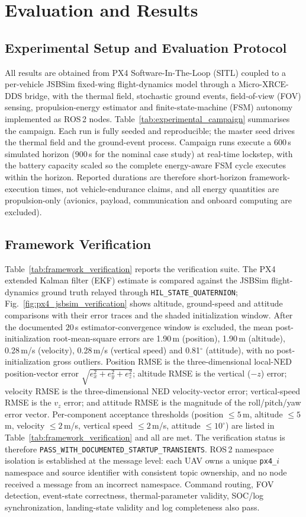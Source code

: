 \section{Evaluation and Results}
\label{sec:results}

\subsection{Experimental Setup and Evaluation Protocol}
All results are obtained from PX4 Software-In-The-Loop (SITL) coupled to a per-vehicle JSBSim fixed-wing flight-dynamics model through a Micro-XRCE-DDS bridge, with the thermal field, stochastic ground events, field-of-view (FOV) sensing, propulsion-energy estimator and finite-state-machine (FSM) autonomy implemented as ROS\,2 nodes. Table~\ref{tab:experimental_campaign} summarises the campaign. Each run is fully seeded and reproducible; the master seed drives the thermal field and the ground-event process. Campaign runs execute a $600$\,s simulated horizon ($900$\,s for the nominal case study) at real-time lockstep, with the battery capacity scaled so the complete energy-aware FSM cycle executes within the horizon. Reported durations are therefore short-horizon framework-execution times, not vehicle-endurance claims, and all energy quantities are propulsion-only (avionics, payload, communication and onboard computing are excluded).

\subsection{Framework Verification}
Table~\ref{tab:framework_verification} reports the verification suite. The PX4 extended Kalman filter (EKF) estimate is compared against the JSBSim flight-dynamics ground truth relayed through \texttt{HIL\_STATE\_QUATERNION}; Fig.~\ref{fig:px4_jsbsim_verification} shows altitude, ground-speed and attitude comparisons with their error traces and the shaded initialization window. After the documented $20$\,s estimator-convergence window is excluded, the mean post-initialization root-mean-square errors are 1.90\,m (position), 1.90\,m (altitude), 0.28\,m/s (velocity), 0.28\,m/s (vertical speed) and 0.81$^\circ$ (attitude), with no post-initialization gross outliers. Position RMSE is the three-dimensional local-NED position-vector error $\sqrt{e_x^2+e_y^2+e_z^2}$; altitude RMSE is the vertical ($-z$) error; velocity RMSE is the three-dimensional NED velocity-vector error; vertical-speed RMSE is the $v_z$ error; and attitude RMSE is the magnitude of the roll/pitch/yaw error vector. Per-component acceptance thresholds (position $\leq5$\,m, altitude $\leq5$\,m, velocity $\leq2$\,m/s, vertical speed $\leq2$\,m/s, attitude $\leq10^\circ$) are listed in Table~\ref{tab:framework_verification} and all are met. The verification status is therefore \texttt{PASS\_WITH\_DOCUMENTED\_STARTUP\_TRANSIENTS}. ROS\,2 namespace isolation is established at the message level: each UAV owns a unique \texttt{px4\_$i$} namespace and source identifier with consistent topic ownership, and no node received a message from an incorrect namespace. Command routing, FOV detection, event-state correctness, thermal-parameter validity, SOC/log synchronization, landing-state validity and log completeness also pass.


